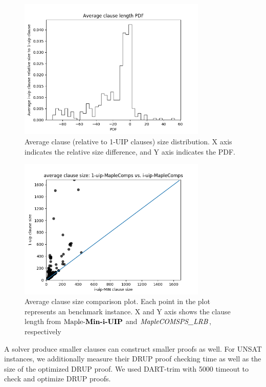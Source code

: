 \begin{figure}
    \centering
    \includegraphics[width=0.8\textwidth, natwidth=610,natheight=642]{clause_length_PDF.png}
    \caption{Average clause (relative to 1-UIP clauses) size distribution. X axis indicates the relative size difference, and Y axis indicates the PDF.}
     \label{fig:len_pdf}
\end{figure}
\begin{figure} \label{fig:len_compare}
    \centering
    \includegraphics[width=0.8\textwidth, natwidth=610,natheight=642 ]{i-uip-sizes-compare.png}
    \caption{Average clause size comparison plot. Each point in the plot represents an benchmark instance. X and Y axis shows the clause length from $\text{Maple-\textbf{Min-i-UIP}}$ and $\textit{MapleCOMSPS\_LRB}$, respectively  }
    \label{fig:len_compare}
\end{figure}





A solver produce smaller clauses can construct smaller proofs as well. For UNSAT instances, we additionally measure their DRUP\cite{} proof checking time as well as the size of the optimized DRUP proof. We used DART-trim \cite{} with 5000 timeout to check and optimize DRUP proofs. 

